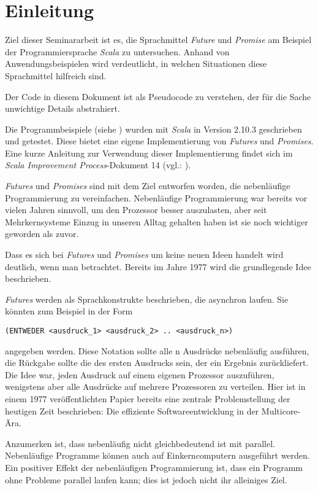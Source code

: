 \section{Einleitung}

Ziel dieser Seminararbeit ist es, die Sprachmittel \emph{Future}
und \emph{Promise} am Beispiel der Programmiersprache \emph{Scala}
zu untersuchen. Anhand von Anwendungsbeispielen wird verdeutlicht, 
in welchen Situationen diese Sprachmittel hilfreich sind.

Der Code in diesem Dokument ist als Pseudocode zu verstehen, der für die
Sache unwichtige Details abstrahiert.

Die Programmbeispiele (siehe \cite{code}) wurden mit
\emph{Scala} in Version 2.10.3 geschrieben und getestet. Diese bietet
eine eigene Implementierung von \emph{Futures} und \emph{Promises}.
Eine kurze Anleitung zur Verwendung dieser Implementierung findet sich im
\emph{Scala Improvement Process}-Dokument 14 (vgl.: \cite{sip14}).

\emph{Futures} und \emph{Promises} sind mit dem Ziel entworfen worden,
die nebenläufige Programmierung zu vereinfachen. Nebenläufige Programmierung
war bereits vor vielen Jahren sinnvoll, um den Prozessor besser auszulasten,
aber seit Mehrkernsysteme Einzug in unseren Alltag gehalten haben
ist sie noch wichtiger geworden als zuvor.

Dass es sich bei \emph{Futures} und \emph{Promises} um keine neuen
Ideen handelt wird deutlich, wenn man \cite{Baker:1977:IGC:872734.806932}
betrachtet. Bereits im Jahre 1977 wird die grundlegende Idee beschrieben.

\emph{Futures} werden als Sprachkonstrukte beschrieben, die asynchron laufen. Sie 
könnten zum Beispiel in der Form 
\begin{lstlisting}
(ENTWEDER <ausdruck_1> <ausdruck_2> .. <ausdruck_n>)
\end{lstlisting}
angegeben werden. Diese Notation sollte alle n Ausdrücke nebenläufig ausführen, 
die Rückgabe sollte die des ersten Ausdrucks sein, der ein Ergebnis zurückliefert.
Die Idee war, jeden Ausdruck auf einem eigenen Prozessor auszuführen, 
wenigstens aber alle Ausdrücke auf mehrere Prozessoren zu verteilen. Hier ist in 
einem 1977 veröffentlichten Papier bereits eine zentrale Problemstellung der 
heutigen Zeit beschrieben: Die effiziente Softwareentwicklung in der Multicore-Ära.

Anzumerken ist, dass nebenläufig nicht gleichbedeutend ist mit parallel.
Nebenläufige Programme können auch auf Einkerncomputern ausgeführt werden.
Ein positiver Effekt der nebenläufigen Programmierung ist, dass ein 
Programm ohne Probleme parallel laufen kann; dies ist jedoch nicht ihr 
alleiniges Ziel.


